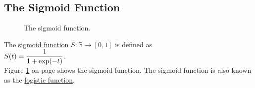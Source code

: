 \subsection{The Sigmoid Function}

\begin{figure}[!ht]
\centering
{}
\vspace*{-0.3cm}
\caption{The sigmoid function.}
\label{fig:sigmoid.eps}
\end{figure}
\FloatBarrier

\begin{Definition}
  The \href{https://en.wikipedia.org/wiki/Sigmoid_function}{sigmoid function} $S: \mathbb{R} \rightarrow [0, 1]$
   is defined as 
\\[0.2cm]
\hspace*{1.3cm}
$\displaystyle S(t) = \frac{1}{1 + \exp(-t)}$.  
\\[0.2cm]
Figure \ref{fig:sigmoid.eps} on page \pageref{fig:sigmoid.eps} shows the sigmoid function.
The sigmoid function is also known as the
\href{https://en.wikipedia.org/wiki/Logistic_function}{logistic function}.  
\eox
\end{Definition}



